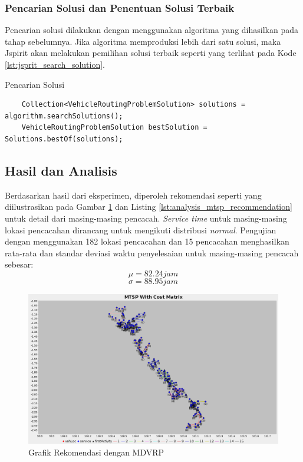 \subsubsection{Pencarian Solusi dan Penentuan Solusi Terbaik}
Pencarian solusi dilakukan dengan menggunakan algoritma yang dihasilkan pada tahap sebelumnya. Jika algoritma memproduksi lebih dari satu solusi, maka Jspirit akan melakukan pemilihan solusi terbaik seperti yang terlihat pada Kode \ref{lst:jsprit_search_solution}. 


\begin{listing}[!]
	\caption{Pencarian Solusi}
	\label{lst:jsprit_search_solution}
	\begin{verbatim}
	Collection<VehicleRoutingProblemSolution> solutions = algorithm.searchSolutions();
	VehicleRoutingProblemSolution bestSolution = Solutions.bestOf(solutions);
	\end{verbatim}
\end{listing}


\subsection{Hasil dan Analisis}
\label{ssec:hasil-analisis}
Berdasarkan hasil dari eksperimen, diperoleh rekomendasi seperti yang diilustrasikan pada Gambar \ref{fig:analysis_mtsp_recommendation} dan Listing \ref{lst:analysis_mtsp_recommendation} untuk detail dari masing-masing pencacah. \textit{Service time} untuk masing-masing lokasi pencacahan dirancang untuk mengikuti distribusi \textit{normal}. Pengujian dengan menggunakan 182 lokasi pencacahan dan 15 pencacahan menghasilkan rata-rata dan standar deviasi waktu penyelesaian untuk masing-masing pencacah sebesar:  
$$ \mu = 82.24 jam $$
$$ \sigma = 88.95 jam $$


\begin{figure}[!]
	\centering
	\includegraphics[width=\textwidth]{Resources/Images/analysis_mtsp_no_time_windows}
	\caption{Grafik Rekomendasi dengan MDVRP}
	\label{fig:analysis_mtsp_recommendation}
\end{figure}


